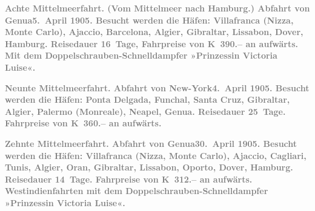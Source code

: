 \pstart
           \textcolor{gray}{\textbf{\textbf{Achte Mittelmeerfahrt.}
                  (Vom Mittelmeer nach Hamburg.) Abfahrt von Genua\textbf{5. April 1905}. Besucht werden die Häfen: Villafranca
                     (Nizza, Monte Carlo), Ajaccio, Barcelona, Algier, Gibraltar, Lissabon, Dover, Hamburg. Reisedauer 16 Tage, Fahrpreise von \textbf{K 390.–} an aufwärts.}}\pend
           {\vspace{1\baselineskip}}
\pstart
           \centering{}\textcolor{gray}{\textbf{Mit dem Doppelschrauben-Schnelldampfer »Prinzessin Victoria
                  Luise«.}}\pend
           
\pstart
           \textcolor{gray}{\textbf{\textbf{Neunte Mittelmeerfahrt.}
                  Abfahrt von New-York\textbf{4. April 1905}. Besucht werden die Häfen: Ponta
                     Delgada, Funchal, Santa Cruz, Gibraltar, Algier, Palermo (Monreale),
                     Neapel, Genua. Reisedauer 25 Tage. Fahrpreise von \textbf{K 360.–} an
                  aufwärts.}}\pend
           
\pstart
           \textcolor{gray}{\textbf{\textbf{Zehnte Mittelmeerfahrt.}
                  Abfahrt von Genua\textbf{30. April 1905}. Besucht werden die Häfen: Villafranca
                     (Nizza, Monte Carlo), Ajaccio, Cagliari, Tunis, Algier, Oran, Gibraltar, Lissabon, Oporto, Dover, Hamburg. Reisedauer 14 Tage. Fahrpreise von \textbf{K 312.–} an aufwärts.}}\pend
           {\vspace{1\baselineskip}}
\pstart
           \centering{}\textcolor{gray}{\textbf{Westindienfahrten mit dem Doppelschrauben-Schnelldampfer
                  »Prinzessin Victoria Luise«.}}\pend
           
